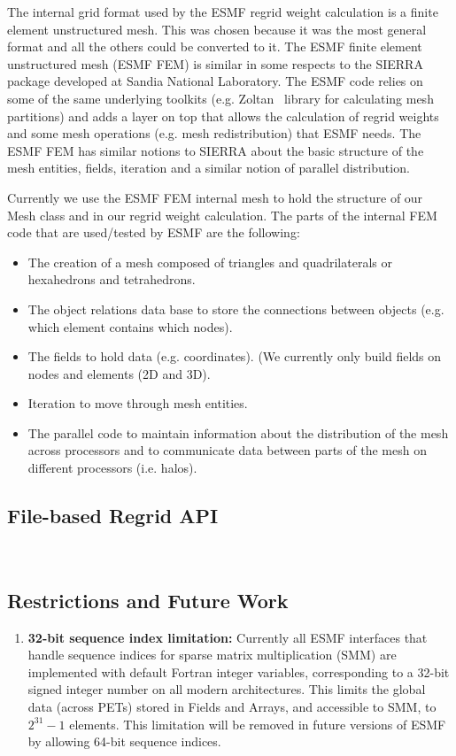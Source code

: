 The internal grid format used by the ESMF regrid weight calculation is a finite element
unstructured mesh. This was chosen because it was the most general format and all the others could be 
converted to it. The ESMF finite element unstructured mesh (ESMF FEM) is similar in some respects to the SIERRA~\cite{Sierra} package 
developed at Sandia National Laboratory. The ESMF code relies on some of the same underlying toolkits (e.g. Zoltan~\cite{Zoltan} library 
for calculating mesh partitions) and adds a layer on top that allows the calculation of regrid weights and some mesh operations 
(e.g. mesh redistribution) that ESMF needs. The ESMF FEM has similar notions to SIERRA about the basic structure of the
mesh entities, fields, iteration and a similar notion of parallel distribution. 

Currently we use the ESMF FEM internal mesh to hold the structure of our Mesh class and 
in our regrid weight calculation. The parts of the internal FEM code that are used/tested by ESMF are the following:
\begin{itemize}
\item The creation of a mesh composed of triangles and quadrilaterals or hexahedrons and tetrahedrons.
\item The object relations data base to store the connections between objects (e.g. which element contains which nodes).
\item The fields to hold data (e.g. coordinates). (We currently only build fields on nodes and elements (2D and 3D).
\item Iteration to move through mesh entities.
\item The parallel code to maintain information about the distribution of the mesh across processors and to communicate data between parts of the mesh on different processors (i.e. halos).
\end{itemize}



\subsection{File-based Regrid API}~\label{sec:filebasedregrid}


\subsection{Restrictions and Future Work}
\begin{enumerate}

\item {\bf 32-bit sequence index limitation:} Currently all ESMF interfaces that handle sequence indices for sparse matrix multiplication (SMM) are implemented with default Fortran integer variables, corresponding to a 32-bit signed integer number on all modern architectures. This limits the global data (across PETs) stored in Fields and Arrays, and accessible to SMM, to $2^{31}-1$ elements. This limitation will be removed in future versions of ESMF by allowing 64-bit sequence indices.

\end{enumerate}
